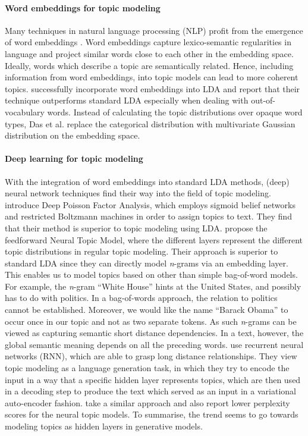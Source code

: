 \paragraph{Word embeddings for topic modeling} Many techniques in natural language processing (NLP) profit from the emergence of word embeddings \citep{mikolovdistributed2013,bengioneural2003}. Word embeddings capture lexico-semantic regularities in language and project similar words close to each other in the embedding space. Ideally, words which describe a topic are semantically related. Hence, including information from word embeddings, into topic models can lead to more coherent topics. \citet{dasgaussian2015} successfully incorporate word embeddings into LDA and report that their technique outperforms standard LDA especially when dealing with out-of-vocabulary words. Instead of calculating the topic distributions over opaque word types, Das et al. replace the categorical distribution with multivariate Gaussian distribution on the embedding space.

\paragraph{Deep learning for topic modeling} With the integration of word embeddings into standard LDA methods, (deep) neural network techniques find their way into the field of topic modeling. \citet{ganscalable2015} introduce Deep Poisson Factor Analysis, which employs sigmoid belief networks and restricted Boltzmann machines in order to assign topics to text. They find that their method is superior to topic modeling using LDA. \citet{cao_novel_2015} propose the feedforward Neural Topic Model, where the different layers represent the different topic distributions in regular topic modeling. Their approach is superior to standard LDA since they can directly model \textit{n}-grams via an embedding layer. This enables us to model topics based on other than simple bag-of-word models. For example, the \textit{n}-gram ``White House'' hints at the United States, and possibly has to do with politics. In a bag-of-words approach, the relation to politics cannot be established. Moreover, we would like the name ``Barack Obama'' to occur once in our topic and not as two separate tokens. As such \textit{n}-grams can be viewed as capturing semantic short distance dependencies. In a text, however, the global semantic meaning depends on all the preceding words. \citet{DiengWGP16} use recurrent neural networks (RNN), which are able to grasp long distance relationships. They view topic modeling as a language generation task, in which they try to encode the input in a way that a specific hidden layer represents topics, which are then used in a decoding step to produce the text which served as an input in a variational auto-encoder fashion. \citet{miao_neural_2016} take a similar approach and also report lower perplexity scores for the neural topic models. To summarise, the trend seems to go towards modeling topics as hidden layers in generative models.

